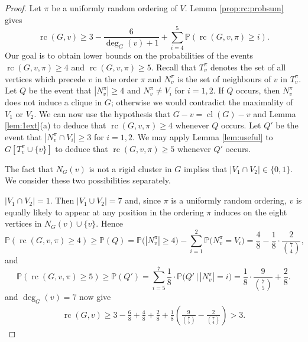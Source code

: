 \documentclass[11pt,a4paper]{article}
\theoremstyle{definition}
\DeclareMathOperator{\rc}{rc}
\DeclareMathOperator{\cl}{cl}
\newcommand{\Prob}{\mathbb{P}}
\begin{document}
\begin{proof} %
Let $\pi$ be a uniformly random ordering of $V$.
Lemma \ref{prop:rc:probsum} gives
\begin{equation}\label{eqnew:100}
\rc(G,v)\geq 3-\frac{6}{\deg_G(v)+1}+\sum_{i=4}^5\Prob(\rc(G,v,\pi)\geq i).
\end{equation}
Our goal is to obtain lower bounds on the probabilities of the events $\rc(G,v,\pi)\geq 4$ and $\rc(G,v,\pi)\geq 5$. Recall that 
$T_v^\pi$ denotes the set of all vertices  which precede $v$ in the order $\pi$ and $N_v^\pi$ is the set of neighbours of $v$ in $T_v^\pi$.
Let $Q$ be the event that $|N_v^\pi|\geq 4$ and $N_v^\pi\neq V_i$ for $i=1,2$.
If $Q$ occurs, then $N_v^\pi$ does not induce a clique in $G$; otherwise we would contradict the maximality of $V_1$ or $V_2$.
We can now use the hypothesis that $G-v=\cl(G)-v$ and
Lemma \ref{lem:1ext}(a) to deduce  that $\rc(G,v,\pi)\geq 4$ whenever $Q$ occurs.
Let $Q'$ be the event that $|N_v^\pi\cap V_i|\geq 3$ for $i=1,2$. 
We may apply Lemma \ref{lem:useful} to $G[T_v^\pi\cup \{v\}]$ to deduce that $\rc(G,v,\pi)\geq 5$ whenever $Q'$ occurs.

The fact that $N_G(v)$ is not a rigid cluster in $G$ implies that $|V_1\cap V_2|\in \{0,1\}.$ We consider these two possibilities separately.

\medskip
{} $|V_1\cap V_2|=1$. 
Then $|V_1\cup V_2|=7$ and, since $\pi$ is a uniformly random ordering, $v$ is equally likely to appear at any position in the ordering $\pi$ induces on the eight vertices in $N_G(v)\cup\{v\}.$
Hence
\begin{equation}\label{fq2}
\Prob(\rc(G, v, \pi)\geq 4) \geq \Prob(Q)=\Prob\big(|N_v^{\pi}|\geq 4\big)- \sum_{i=1}^2\Prob\big(N_v^{\pi}= V_i\big)
= \frac{4}{8}-\frac{1}{8}\cdot \frac{2}{\binom{7}{4}},
\end{equation}
and
\begin{equation}\label{fq3}
\Prob(\rc(G, v, \pi)\geq 5) \geq \Prob(Q')= \sum_{i=5}^7
\frac{1}{8}\cdot\Prob\big(Q'\,\big|\,|N_v^{\pi}|=i\big) =\frac{1}{8}\cdot\frac{9}{\binom{7}{5}}+\frac{2}{8}.
\end{equation}
  and 
$\deg_G(v)= 7$
now give
\begin{align*}
\rc(G,v)\geq 3- \frac{6}{8}+\frac{4}{8}+\frac{2}{8}+\frac{1}{8}\left(\frac{9}{\binom{7}{5}}-\frac{2}{\binom{7}{4}}\right)> 3.
\end{align*}


\end{proof}
\end{document}
